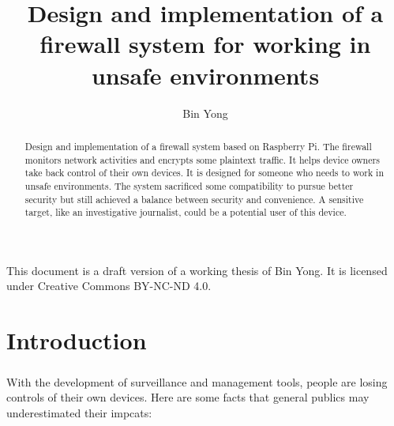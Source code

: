 \documentclass[mscthesis]{usiinfthesis}
\title{Design and implementation of a firewall system for working in unsafe environments} %
\author{Bin Yong} %
\begin{document}

\maketitle %

\frontmatter %

\begin{abstract}
  \paragraph{}
  Design and implementation of a firewall system based on Raspberry Pi. The firewall monitors network activities and encrypts some plaintext traffic. It helps device owners take back control of their own devices. It is designed for someone who needs to work in unsafe environments. The system sacrificed some compatibility to pursue better security but still achieved a balance between security and convenience. A sensitive target, like an investigative journalist, could be a potential user of this device.

\end{abstract}

\begin{acknowledgements}
  \paragraph{}
  This document is a draft version of a working thesis of Bin Yong. It is licensed under Creative Commons BY-NC-ND 4.0.
\end{acknowledgements}

\tableofcontents
\listoffigures %
\listoftables %

\mainmatter

\chapter{Introduction}
\paragraph{}
With the development of surveillance and management tools, people are losing controls of their own devices. Here are some facts that general publics may underestimated their impcats:
\end{document}
